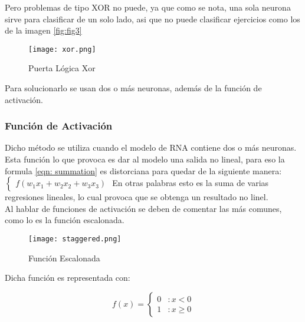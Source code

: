         Pero problemas de tipo XOR no puede, ya que como se nota, una sola neurona sirve para 
        clasificar de un solo lado, asi que no puede clasificar ejercicios
        como los de la imagen \eqref{fig:fig3}

        \begin{figure}[H]
            \centering
            \texttt{[image: xor.png]}
            \caption{Puerta L\'ogica Xor \cite{mcmahon2014}}
            \label{fig:fig3}
        \end{figure}

        Para solucionarlo se usan dos o m\'as neuronas, adem\'as de la funci\'on de activaci\'on.

            \subsubsection{Funci\'on de Activaci\'on} \label{sec: activation}
                Dicho m\'etodo se utiliza cuando el modelo de RNA contiene dos o m\'as neuronas.
                Esta funci\'on lo que provoca es dar al modelo una salida no lineal, para 
                eso la formula \eqref{eqn: summation} es distorciana para quedar de la siguiente 
                manera: 
                $\begin{cases}
                    f( w_1x_1 + w_2x_2 + w_3x_3 )
                \end{cases}$
                En otras palabras esto es la suma de varias regresiones lineales, lo cual provoca que se obtenga 
                un resultado no linel. \\
                Al hablar de funciones de activaci\'on se deben de comentar las m\'as comunes, como lo es la 
                funci\'on escalonada.
                
                \begin{figure}[H]
                    \centering
                    \texttt{[image: staggered.png]}
                    \caption{Funci\'on Escalonada}
                    \label{fig:fig4}
                \end{figure}

                Dicha funci\'on es representada con: 
                
                \[f(x) = \left\{ \begin{array}{lr} 0 & : x < 0\\ 1 & : x \ge 0 \end{array} \right. \]

